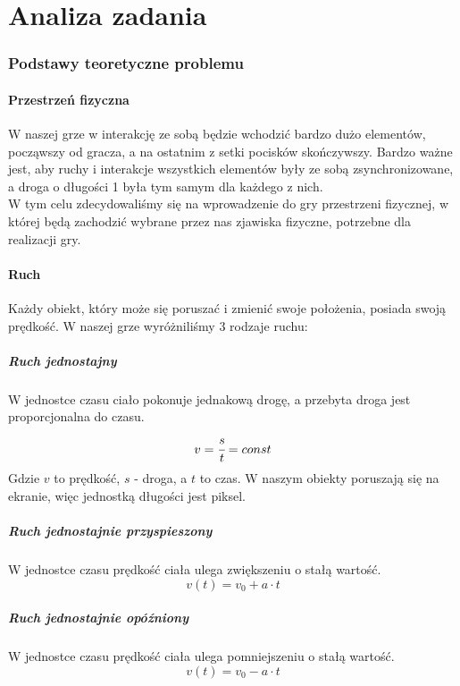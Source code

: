 \documentclass[a4paper,twoside]{article}
\begin{document}
	
	\newpage
	
	\part{\huge \textbf{Analiza zadania}}
	
	\section{Podstawy teoretyczne problemu}
	\subsection{Przestrzeń fizyczna}
	W naszej grze w interakcję ze sobą będzie wchodzić bardzo dużo elementów, począwszy od gracza, a na ostatnim z setki pocisków skończywszy. Bardzo ważne jest, aby ruchy i interakcje wszystkich elementów były ze sobą zsynchronizowane, a droga o długości 1 była tym samym dla każdego z nich.\\
	W tym celu zdecydowaliśmy się na wprowadzenie do gry przestrzeni fizycznej, w której będą zachodzić wybrane przez nas zjawiska fizyczne, potrzebne dla realizacji gry.
	
	\subsection{Ruch}
	Każdy obiekt, który może się poruszać i zmienić swoje położenia, posiada swoją prędkość. W naszej grze wyróżniliśmy 3 rodzaje ruchu:
	\subsubsection{Ruch jednostajny}
	W jednostce czasu ciało pokonuje jednakową drogę, a przebyta droga jest proporcjonalna do czasu.
	$$ v=\cfrac{s}{t}=const$$
	Gdzie $ v $ to prędkość, $ s $ - droga, a $ t $ to czas. W naszym obiekty poruszają się na ekranie, więc jednostką długości jest piksel.
	\subsubsection{Ruch jednostajnie przyspieszony}
	W jednostce czasu prędkość ciała ulega zwiększeniu o stałą wartość.
	$$ v(t)=v_0+a\cdot t $$
	\subsubsection{Ruch jednostajnie opóźniony}
	W jednostce czasu prędkość ciała ulega pomniejszeniu o stałą wartość.
	$$ v(t)=v_0-a\cdot t $$
	
\end{document}

